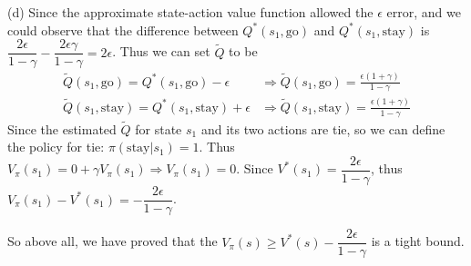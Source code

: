 \begin{homeworkProblem}
(d) Since the approximate state-action value function allowed the $\epsilon$ error, and we could observe that the difference between $Q^*(s_1,\text{go})$ and $Q^*(s_1,\text{stay})$ is $\dfrac{2\epsilon}{1-\gamma} - \dfrac{2\epsilon\gamma}{1-\gamma} = 2\epsilon$. Thus we can set $\tilde{Q}$ to be
\begin{align*}
\tilde{Q}(s_1, \text{go}) = Q^*(s_1, \text{go}) - \epsilon &\Rightarrow \tilde{Q}(s_1,\text{go}) = \frac{\epsilon(1+\gamma)}{1-\gamma} \\
\tilde{Q}(s_1, \text{stay}) = Q^*(s_1, \text{stay}) + \epsilon &\Rightarrow \tilde{Q}(s_1,\text{stay}) = \frac{\epsilon(1+\gamma)}{1-\gamma}
\end{align*}
Since the estimated $\tilde{Q}$ for state $s_1$ and its two actions are tie, so we can define the policy for tie: $\pi(\text{stay}|s_1)=1$. Thus $V_{\pi}(s_1)=0 + \gamma V_{\pi}(s_1)\Rightarrow V_{\pi}(s_1)=0$.
Since $V^*(s_1)=\dfrac{2\epsilon}{1-\gamma}$, thus $V_{\pi}(s_1)-V^*(s_1)=-\dfrac{2\epsilon}{1-\gamma}$.

So above all, we have proved that the $V_{\pi}(s)\geq V^*(s)-\dfrac{2\epsilon}{1-\gamma}$ is a tight bound.

\end{homeworkProblem}

\newpage